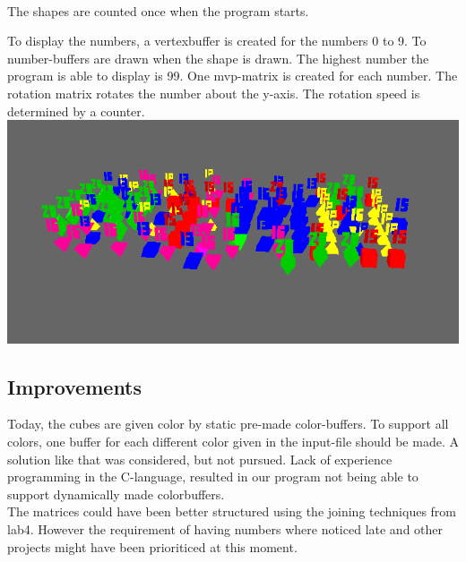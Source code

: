 \mbox{}\\
The shapes are counted once when the program starts. 

To display the numbers, a vertexbuffer is created for the numbers 0 to 9. To number-buffers are drawn when the shape is drawn. The highest number the program is able to display is 99. One mvp-matrix is created for each number. The rotation matrix rotates the number about the y-axis. The rotation speed is determined by a counter. 
\\
\includegraphics[scale=0.75]{with_numbers.png}
\mbox{}\\

\subsection{Improvements}
Today, the cubes are given color by static pre-made color-buffers. 
To support all colors, one buffer for each different color given in the input-file should be made. 
A solution like that was considered, but not pursued.
Lack of experience programming in the C-language, resulted in our program not being able to support dynamically made colorbuffers.
\\
The matrices could have been better structured using the joining techniques from lab4. However the requirement of having numbers where noticed late and other projects might have been prioriticed at this moment. 

